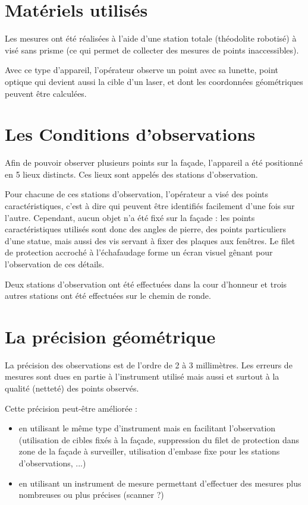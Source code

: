 \section{Matériels utilisés}
Les mesures ont été réalisées à l'aide d'une station totale (théodolite robotisé) à visé sans prisme (ce qui permet de collecter des mesures de points inaccessibles).

Avec ce type d'appareil, l'opérateur observe un point avec sa lunette, point optique qui devient aussi la cible d'un laser, et dont les coordonnées géométriques peuvent être calculées.

\section{Les Conditions d'observations}
Afin de pouvoir observer plusieurs points sur la façade, l'appareil a été positionné en 5 lieux distincts.
Ces lieux sont appelés des stations d'observation.

Pour chacune de ces stations d'observation, l'opérateur a visé des points caractéristiques, c'est à dire qui peuvent être identifiés facilement d'une fois sur l'autre.
Cependant, aucun objet n'a été fixé sur la façade : les points caractéristiques utilisés sont donc des angles de pierre, des points particuliers d'une statue, mais aussi des vis servant à fixer des plaques aux fenêtres.
Le filet de protection accroché à l'échafaudage forme un écran visuel gênant pour l'observation de ces détails.

Deux stations d'observation ont été effectuées dans la cour d'honneur et trois autres stations ont été effectuées sur le chemin de ronde.

\section{La précision géométrique}

La précision des observations est de l'ordre de 2 à 3 millimètres.
Les erreurs de mesures sont dues en partie à l'instrument utilisé mais aussi et surtout à la qualité (netteté) des points observés.

Cette précision peut-être améliorée :
\begin{itemize}
  \item en utilisant le même type d'instrument mais en facilitant l'observation (utilisation de cibles fixés à la façade, suppression du filet de protection dans zone de la façade à surveiller, utilisation d'embase fixe pour les stations d'observations, ...)
  \item en utilisant un instrument de mesure permettant d'effectuer des mesures plus nombreuses ou plus précises (scanner ?)
\end{itemize}

